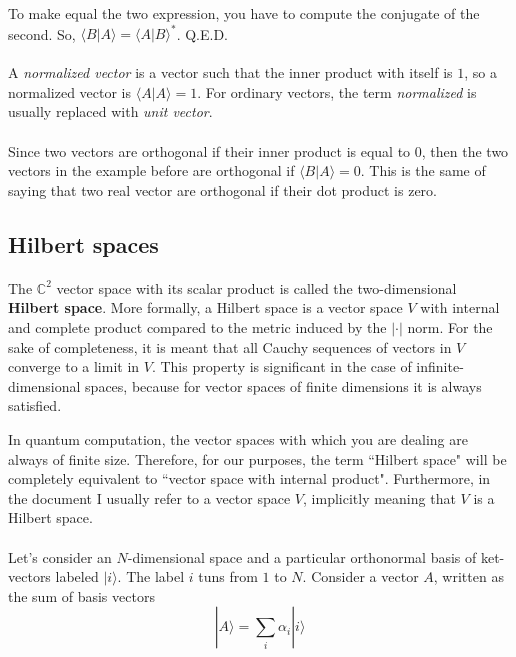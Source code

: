 \documentclass[a4paper,10pt]{article}
\begin{document}
To make equal the two expression, you have to compute the conjugate of the second. So, $\langle B|A\rangle = \langle A|B\rangle^*$. Q.E.D.

\paragraph{} A \textit{normalized vector} is a vector such that the inner product with itself is $1$, so a normalized vector is $\langle A|A\rangle = 1$. For ordinary vectors, the term \textit{normalized} is usually replaced with \textit{unit vector}.

\paragraph{} Since two vectors are orthogonal if their inner product is equal to $0$, then the two vectors in the example before are orthogonal if $\langle B|A\rangle = 0$. This is the same of saying that two real vector are orthogonal if their dot product is zero.

\subsection{Hilbert spaces}

\paragraph{} The ${\mathbb{C}}^2$ vector space with its scalar product is called the two-dimensional \textbf{Hilbert space}. More formally, a Hilbert space is a vector space $V$ with internal and complete product compared to the metric induced by the $|\cdot|$ norm. For the sake of completeness, it is meant that all Cauchy sequences of vectors in $V$ converge to a limit in $V$. This property is significant in the case of infinite-dimensional spaces, because for vector spaces of finite dimensions it is always satisfied.

In quantum computation, the vector spaces with which you are dealing are always of finite size. Therefore, for our purposes, the term ``Hilbert space" will be completely equivalent to ``vector space with internal product". Furthermore, in the document I usually refer to a vector space $V$, implicitly meaning that $V$ is a Hilbert space.

\paragraph{} Let's consider an $N$-dimensional space and a particular orthonormal basis of ket-vectors labeled $|i\rangle$. The label $i$ tuns from $1$ to $N$. Consider a vector $A$, written as the sum of basis vectors
$$|A\rangle = \sum\limits_{i}\alpha_i|i\rangle$$
\end{document}
